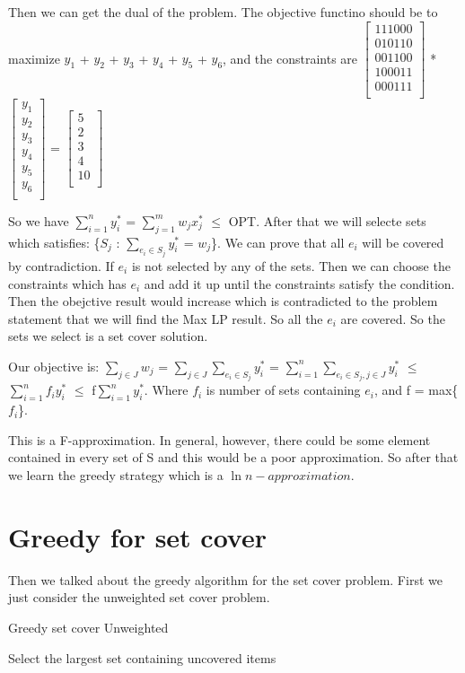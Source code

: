 \documentclass[usletter]{article}
\begin{document}
Then we can get the dual of the problem. The objective functino should be to maximize $y_{1}$ + $y_{2}$ + $y_{3}$ + $y_{4}$ + $y_{5}$ + $y_{6}$, and the constraints are $\left[
\begin{array}{c}
111000 \\
010110 \\
001100 \\
100011 \\
000111 \\
\end{array}
\right]$ * $\left[
\begin{array}{c}
y_{1} \\
y_{2} \\
y_{3} \\
y_{4} \\
y_{5} \\
y_{6} \\
\end{array}
\right]$ = $\left[
\begin{array}{c}
5 \\
2 \\
3 \\
4 \\
10 \\
\end{array}
\right]$

So we have $\sum_{i = 1}^n y_{i}^*$ = $\sum_{j = 1}^m w_{j}x_{j}^*$ $\le$ OPT.
After that we will selecte sets which satisfies:  \{$S_{j}$ :  $\sum_{e_{i} \in S_{j}} y_{i}^*$ = $w_j$\}. We can prove that all $e_i$ will be covered by contradiction. If $e_i$ is not selected by any of the sets. Then we can choose the constraints which has $e_i$ and add it up until the constraints satisfy the condition. Then the obejctive result would increase which is contradicted to the problem statement that we will find the Max LP result. So all the $e_i$ are covered. So the sets we select is a set cover solution.

Our objective is: $\sum_{j \in J} w_j$ = $\sum_{j \in J} \sum_{e_{i} \in S_{j}} y_{i}^*$ = $\sum_{i = 1}^n \sum_{e_{i} \in S_{j}, j \in J} y_{i}^*$ $\le$ $\sum_{i = 1}^n f_iy_{i}^*$ $\le$ f$\sum_{i = 1}^n y_{i}^*$.
Where $f_i$ is number of sets containing $e_i$, and f = max\{$f_i$\}.

This is a F-approximation. In general, however, there could be some element contained in every set of S and this would be a poor approximation. So after that we learn the greedy strategy which is a $\ln{n}-approximation$.

\section{Greedy for set cover}
Then we talked about the greedy algorithm for the set cover problem. First we just consider the unweighted set cover problem.
\begin{algorithm}
\caption{Greedy set cover Unweighted}
\begin{algorithmic}[1]
	\State Select the largest set containing uncovered items
\EndWhile
\end{algorithmic}
\end{algorithm}
\end{document}
